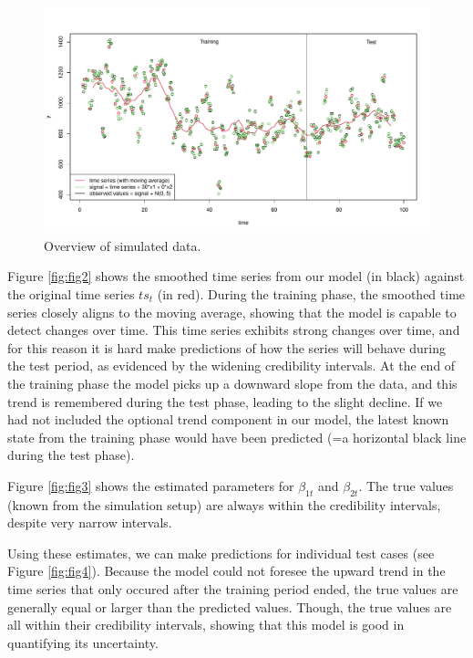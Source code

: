 \documentclass{article}
\begin{document}
\begin{figure}
	\centering
	\includegraphics[width=630pt, angle=270]{visualize_simulated_data.pdf}
	\caption{Overview of simulated data.}
	\label{fig:fig1}
\end{figure}

Figure \ref{fig:fig2} shows the smoothed time series from our model (in black) against the original time series $ts_t$ (in red). During the training phase, the smoothed time series closely aligns to the moving average, showing that the model is capable to detect changes over time. This time series exhibits strong changes over time, and for this reason it is hard make predictions of how the series will behave during the test period, as evidenced by the widening credibility intervals. At the end of the training phase the model picks up a downward slope from the data, and this trend is remembered during the test phase, leading to the slight decline. If we had not included the optional trend component in our model, the latest known state from the training phase would have been predicted (=a horizontal black line during the test phase).

Figure \ref{fig:fig3} shows the estimated parameters for $\beta_{1t}$ and $\beta_{2t}$. The true values (known from the simulation setup) are always within the credibility intervals, despite very narrow intervals.

Using these estimates, we can make predictions for individual test cases (see Figure \ref{fig:fig4}). Because the model could not foresee the upward trend in the time series that only occured after the training period ended, the true values are generally equal or larger than the predicted values. Though, the true values are all within their credibility intervals, showing that this model is good in quantifying its uncertainty.
\end{document}
